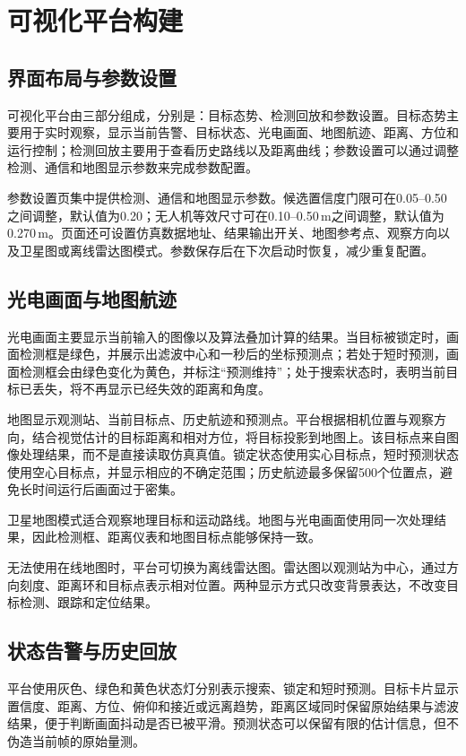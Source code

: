 \section{可视化平台构建}

\subsection{界面布局与参数设置}

可视化平台由三部分组成，分别是：目标态势、检测回放和参数设置。目标态势主要用于实时观察，显示当前告警、目标状态、光电画面、地图航迹、距离、方位和运行控制；检测回放主要用于查看历史路线以及距离曲线；参数设置可以通过调整检测、通信和地图显示参数来完成参数配置。

参数设置页集中提供检测、通信和地图显示参数。候选置信度门限可在0.05--0.50之间调整，默认值为0.20；无人机等效尺寸可在0.10--0.50\,m之间调整，默认值为0.270\,m。页面还可设置仿真数据地址、结果输出开关、地图参考点、观察方向以及卫星图或离线雷达图模式。参数保存后在下次启动时恢复，减少重复配置。

\subsection{光电画面与地图航迹}

光电画面主要显示当前输入的图像以及算法叠加计算的结果。当目标被锁定时，画面检测框是绿色，并展示出滤波中心和一秒后的坐标预测点；若处于短时预测，画面检测框会由绿色变化为黄色，并标注“预测维持”；处于搜索状态时，表明当前目标已丢失，将不再显示已经失效的距离和角度。

地图显示观测站、当前目标点、历史航迹和预测点。平台根据相机位置与观察方向，结合视觉估计的目标距离和相对方位，将目标投影到地图上。该目标点来自图像处理结果，而不是直接读取仿真真值。锁定状态使用实心目标点，短时预测状态使用空心目标点，并显示相应的不确定范围；历史航迹最多保留500个位置点，避免长时间运行后画面过于密集。

卫星地图模式适合观察地理目标和运动路线。地图与光电画面使用同一次处理结果，因此检测框、距离仪表和地图目标点能够保持一致。

无法使用在线地图时，平台可切换为离线雷达图。雷达图以观测站为中心，通过方向刻度、距离环和目标点表示相对位置。两种显示方式只改变背景表达，不改变目标检测、跟踪和定位结果。

\subsection{状态告警与历史回放}

平台使用灰色、绿色和黄色状态灯分别表示搜索、锁定和短时预测。目标卡片显示置信度、距离、方位、俯仰和接近或远离趋势，距离区域同时保留原始结果与滤波结果，便于判断画面抖动是否已被平滑。预测状态可以保留有限的估计信息，但不伪造当前帧的原始量测。

